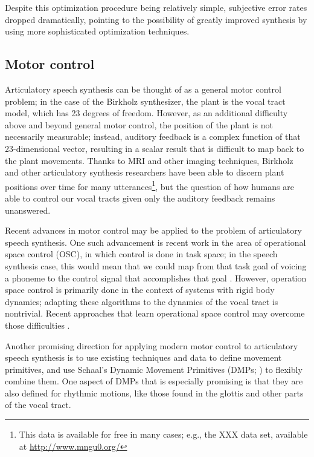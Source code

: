 \documentclass{article}
\begin{document}
Despite this optimization procedure
being relatively simple,
subjective error rates dropped dramatically,
pointing to the possibility
of greatly improved synthesis
by using more sophisticated optimization techniques.

\subsection{Motor control}
\label{subsec:motor-control}

Articulatory speech synthesis
can be thought of as a
general motor control problem;
in the case of the Birkholz synthesizer,
the plant is the vocal tract model,
which has 23 degrees of freedom.
However, as an additional difficulty
above and beyond general motor control,
the position of the plant is
not necessarily measurable;
instead, auditory feedback is
a complex function of that
23-dimensional vector,
resulting in a scalar result
that is difficult to map
back to the plant movements.
Thanks to MRI and other
imaging techniques,
Birkholz and other articulatory
synthesis researchers have
been able to discern
plant positions over time
for many utterances\footnote{This
data is available for free in many cases;
e.g., the XXX data set,
available at \url{http://www.mngu0.org/}},
but the question of how humans
are able to control our vocal tracts
given only the auditory feedback
remains unanswered.

Recent advances in motor control
may be applied to the problem
of articulatory speech synthesis.
One such advancement is recent work
in the area of operational space control (OSC),
in which control is done in task space;
in the speech synthesis case,
this would mean that we could
map from that task goal
of voicing a phoneme
to the control signal
that accomplishes that goal
\citep{nakanishi2008}.
However, operation space control
is primarily done in the context
of systems with rigid body dynamics;
adapting these algorithms
to the dynamics of the vocal tract
is nontrivial.
Recent approaches that learn
operational space control
may overcome those difficulties
\citep{peters2008}.

Another promising direction
for applying modern motor control
to articulatory speech synthesis
is to use existing techniques and data
to define movement primitives,
and use Schaal's Dynamic Movement Primitives
(DMPs; \citealp{schaal2006})
to flexibly combine them.
One aspect of DMPs that is especially promising
is that they are also defined
for rhythmic motions,
like those found in the glottis
and other parts of the vocal tract.
\end{document}
